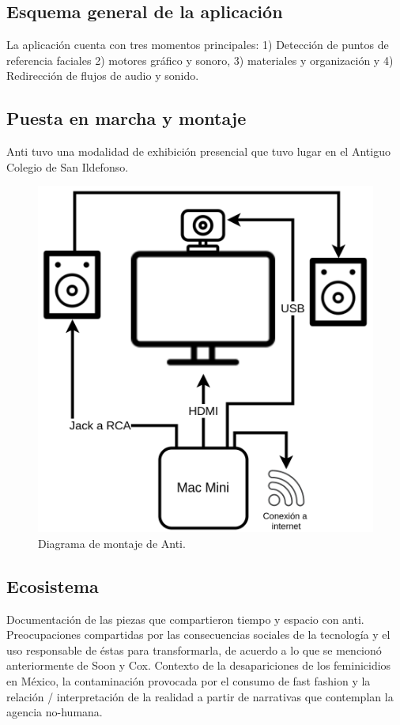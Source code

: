 \subsection{Esquema general de la aplicación}

La aplicación cuenta con tres momentos principales: 1) Detección de puntos de referencia faciales 2) motores gráfico y sonoro, 3) materiales y organización y 4) Redirección de flujos de audio y sonido.  

\subsection{Puesta en marcha y montaje}

Anti tuvo una modalidad de exhibición presencial que tuvo lugar en el Antiguo Colegio de San Ildefonso.

\begin{figure}[tb]
\centering 
\includegraphics[width=0.7\columnwidth]{img/antiExWhite.png} 
\caption[Diagrama de Montaje Anti]{Diagrama de montaje de Anti.} %
\label{fig:gallery} 
\end{figure}

\subsection{Ecosistema}

Documentación de las piezas que compartieron tiempo y espacio con anti. Preocupaciones compartidas por las consecuencias sociales de la tecnología y el uso responsable de éstas para transformarla, de acuerdo a lo que se mencionó anteriormente de Soon y Cox. Contexto de la desapariciones de los feminicidios en México, la contaminación provocada por el consumo de fast fashion y la relación / interpretación de la realidad a partir de narrativas que contemplan la agencia no-humana. 

